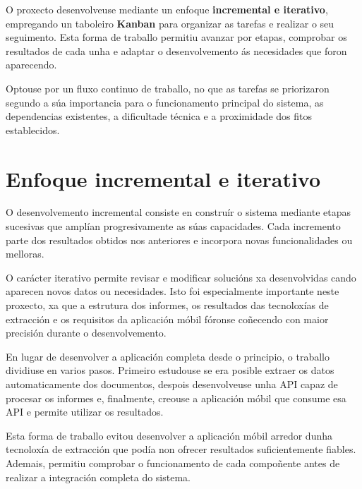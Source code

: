 
O proxecto desenvolveuse mediante un enfoque \textbf{incremental e iterativo}, empregando un taboleiro \textbf{Kanban} para organizar as tarefas e realizar o seu seguimento. Esta forma de traballo permitiu avanzar por etapas, comprobar os resultados de cada unha e adaptar o desenvolvemento ás necesidades que foron aparecendo.

Optouse por un fluxo continuo de traballo, no que as tarefas se priorizaron segundo a súa importancia para o funcionamento principal do sistema, as dependencias existentes, a dificultade técnica e a proximidade dos fitos establecidos.

\section{Enfoque incremental e iterativo}

O desenvolvemento incremental consiste en construír o sistema mediante etapas sucesivas que amplían progresivamente as súas capacidades. Cada incremento parte dos resultados obtidos nos anteriores e incorpora novas funcionalidades ou melloras.

O carácter iterativo permite revisar e modificar solucións xa desenvolvidas cando aparecen novos datos ou necesidades. Isto foi especialmente importante neste proxecto, xa que a estrutura dos informes, os resultados das tecnoloxías de extracción e os requisitos da aplicación móbil fóronse coñecendo con maior precisión durante o desenvolvemento.

En lugar de desenvolver a aplicación completa desde o principio, o traballo dividiuse en varios pasos. Primeiro estudouse se era posible extraer os datos automaticamente dos documentos, despois desenvolveuse unha API capaz de procesar os informes e, finalmente, creouse a aplicación móbil que consume esa API e permite utilizar os resultados.

Esta forma de traballo evitou desenvolver a aplicación móbil arredor dunha tecnoloxía de extracción que podía non ofrecer resultados suficientemente fiables. Ademais, permitiu comprobar o funcionamento de cada compoñente antes de realizar a integración completa do sistema.


